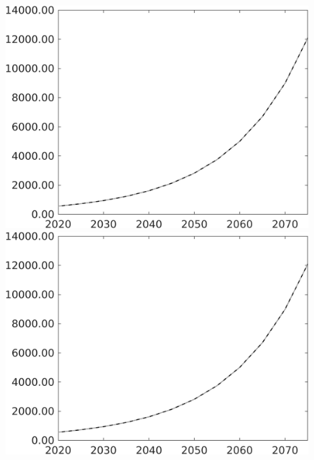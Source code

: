 \documentclass[12pt]{article}
\begin{document}
\begin{figure}[h!!]
\begin{minipage}[]{0.32\textwidth}
\end{minipage}	
\begin{minipage}[]{0.32\textwidth}
\includegraphics[width=1\textwidth]{../../codding_model/own_basedOnFried/optimalPol_010922_revision/figures/all_13Sept22/PerdifNoTauf_Equlab_regime0_CompTaul_LgLf_spillover0_nsk1_xgr1_knspil1_sep1_LFlimit0_emsbase0_countec0_GovRev0_etaa0.79_lgd0.png}
\end{minipage}	
\begin{minipage}[]{0.32\textwidth}
\includegraphics[width=1\textwidth]{../../codding_model/own_basedOnFried/optimalPol_010922_revision/figures/all_13Sept22/PerdifNoTauf_Equlab_regime0_CompTaul_GFF_spillover0_nsk1_xgr1_knspil1_sep1_LFlimit0_emsbase0_countec0_GovRev0_etaa0.79_lgd0.png}

\end{minipage}
\end{figure}
\end{document}
